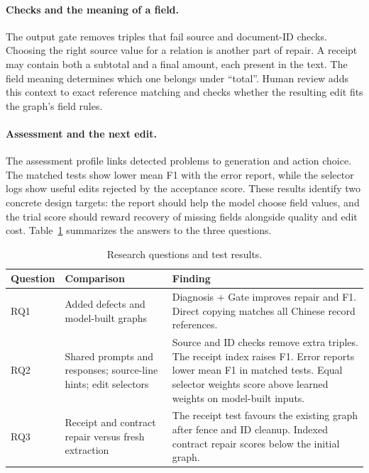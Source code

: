 \paragraph{Checks and the meaning of a field.}
The output gate removes triples that fail source and document-ID checks.
Choosing the right source value for a relation is another part of repair.
A receipt may contain both a subtotal and a final amount, each present
in the text. The field meaning determines which one belongs under ``total''.
Human review adds this context to exact reference matching and checks
whether the resulting edit fits the graph's field rules.

\paragraph{Assessment and the next edit.}
The assessment profile links detected problems to generation and action
choice. The matched tests show lower mean F1 with the error report, while
the selector logs show useful edits rejected by the acceptance score.
These results identify two concrete design targets: the report should
help the model choose field values, and the trial score should reward
recovery of missing fields alongside quality and edit cost.
Table~\ref{tab:research_answers} summarizes the answers to the three questions.

\begin{table}[t]
\centering
\caption{Research questions and test results.}
\label{tab:research_answers}
\small
\begin{tabularx}{\textwidth}{@{}p{}XX@{}}
\toprule
Question & Comparison & Finding \\
\midrule
RQ1 & Added defects and model-built graphs
& Diagnosis + Gate improves repair and F1. Direct copying matches all Chinese record references. \\
RQ2 & Shared prompts and responses; source-line hints; edit selectors
& Source and ID checks remove extra triples. The receipt index raises F1. Error reports lower mean F1 in matched tests. Equal selector weights score above learned weights on model-built inputs. \\
RQ3 & Receipt and contract repair versus fresh extraction
& The receipt test favours the existing graph after fence and ID cleanup. Indexed contract repair scores below the initial graph. \\
\bottomrule
\end{tabularx}
\end{table}

